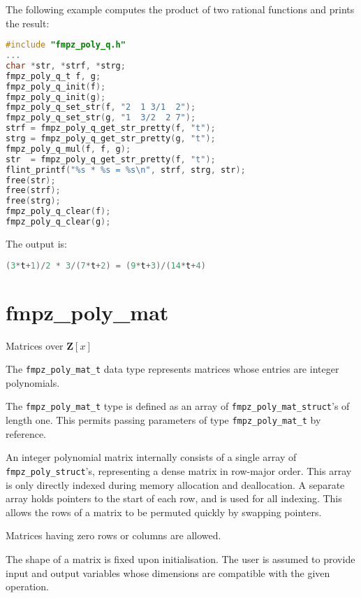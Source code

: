 \documentclass[a4paper,10pt]{book}
\newcommand{\code}{\lstinline}
\begin{document}
{{The following example computes the product of two rational functions and
prints the result:
\begin{lstlisting}[language=c]
#include "fmpz_poly_q.h"
...
char *str, *strf, *strg;
fmpz_poly_q_t f, g;
fmpz_poly_q_init(f);
fmpz_poly_q_init(g);
fmpz_poly_q_set_str(f, "2  1 3/1  2");
fmpz_poly_q_set_str(g, "1  3/2  2 7");
strf = fmpz_poly_q_get_str_pretty(f, "t");
strg = fmpz_poly_q_get_str_pretty(g, "t");
fmpz_poly_q_mul(f, f, g);
str  = fmpz_poly_q_get_str_pretty(f, "t");
flint_printf("%s * %s = %s\n", strf, strg, str);
free(str);
free(strf);
free(strg);
fmpz_poly_q_clear(f);
fmpz_poly_q_clear(g);
\end{lstlisting}

The output is:
\begin{lstlisting}[language=c]
(3*t+1)/2 * 3/(7*t+2) = (9*t+3)/(14*t+4)
\end{lstlisting}




\chapter{fmpz\_poly\_mat}
\epigraph{Matrices over $\mathbf{Z}[x]$}{}

The \code{fmpz_poly_mat_t} data type represents matrices whose
entries are integer polynomials.

The \code{fmpz_poly_mat_t} type is defined as an array of
\code{fmpz_poly_mat_struct}'s of length one.
This  permits passing parameters of type \code{fmpz_poly_mat_t}
by reference.

An integer polynomial matrix internally consists of a single array
of \code{fmpz_poly_struct}'s, representing a dense matrix in
row-major order. This array is only directly indexed
during memory allocation and deallocation. A separate array
holds pointers to the start of each row, and is used for all
indexing. This allows the rows of a matrix to be permuted
quickly by swapping pointers.

Matrices having zero rows or columns are allowed.

The shape of a matrix is fixed upon initialisation.
The user is assumed to provide input and output variables
whose dimensions are compatible with the given operation.

}}
\end{document}
